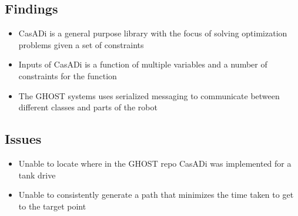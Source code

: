 \subsection*{Findings}
\begin{itemize}
    \item CasADi is a general purpose library with the focus of solving optimization problems given a set of constraints
    \item Inputs of CasADi is a function of multiple variables and a number of constraints for the function
    \item The GHOST systems uses serialized messaging to communicate between different classes and parts of the robot
\end{itemize}

\subsection*{Issues}
\begin{itemize}
    \item Unable to locate where in the GHOST repo CasADi was implemented for a tank drive
    \item Unable to consistently generate a path that minimizes the time taken to get to the target point
\end{itemize}
